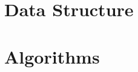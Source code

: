 \documentclass{book}
\begin{document}
\frontmatter



\mainmatter
\tableofcontents





\part{Data Structure}




\part{Algorithms}





\backmatter


\end{document}
